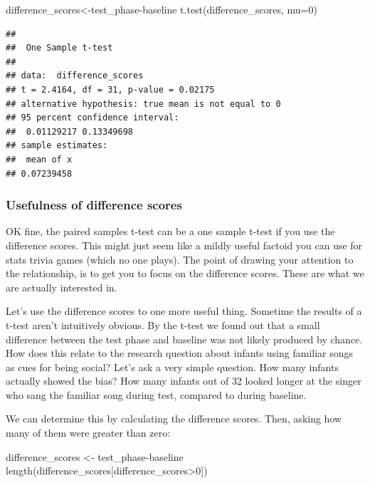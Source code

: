 \documentclass[
]{book}
\newenvironment{Shaded}{\begin{snugshade}}{\end{snugshade}}
\newcommand{\AttributeTok}[1]{\textcolor[rgb]{0.77,0.63,0.00}{#1}}
\newcommand{\DecValTok}[1]{\textcolor[rgb]{0.00,0.00,0.81}{#1}}
\newcommand{\FunctionTok}[1]{\textcolor[rgb]{0.00,0.00,0.00}{#1}}
\newcommand{\NormalTok}[1]{#1}
\newcommand{\OtherTok}[1]{\textcolor[rgb]{0.56,0.35,0.01}{#1}}
\newcommand{\SpecialCharTok}[1]{\textcolor[rgb]{0.00,0.00,0.00}{#1}}
\begin{document}
\begin{Shaded}
\begin{Highlighting}[]
\NormalTok{difference\_scores}\OtherTok{\textless{}{-}}\NormalTok{test\_phase}\SpecialCharTok{{-}}\NormalTok{baseline}
\FunctionTok{t.test}\NormalTok{(difference\_scores, }\AttributeTok{mu=}\DecValTok{0}\NormalTok{)}
\end{Highlighting}
\end{Shaded}

\begin{verbatim}
## 
##  One Sample t-test
## 
## data:  difference_scores
## t = 2.4164, df = 31, p-value = 0.02175
## alternative hypothesis: true mean is not equal to 0
## 95 percent confidence interval:
##  0.01129217 0.13349698
## sample estimates:
##  mean of x 
## 0.07239458
\end{verbatim}

\hypertarget{usefulness-of-difference-scores}{%
\subsubsection{Usefulness of difference scores}\label{usefulness-of-difference-scores}}

OK fine, the paired samples t-test can be a one sample t-test if you use the difference scores. This might just seem like a mildly useful factoid you can use for stats trivia games (which no one plays). The point of drawing your attention to the relationship, is to get you to focus on the difference scores. These are what we are actually interested in.

Let's use the difference scores to one more useful thing. Sometime the results of a t-test aren't intuitively obvious. By the t-test we found out that a small difference between the test phase and baseline was not likely produced by chance. How does this relate to the research question about infants using familiar songs as cues for being social? Let's ask a very simple question. How many infants actually showed the bias? How many infants out of 32 looked longer at the singer who sang the familiar song during test, compared to during baseline.

We can determine this by calculating the difference scores. Then, asking how many of them were greater than zero:

\begin{Shaded}
\begin{Highlighting}[]
\NormalTok{difference\_scores }\OtherTok{\textless{}{-}}\NormalTok{ test\_phase}\SpecialCharTok{{-}}\NormalTok{baseline}
\FunctionTok{length}\NormalTok{(difference\_scores[difference\_scores}\SpecialCharTok{\textgreater{}}\DecValTok{0}\NormalTok{])}
\end{Highlighting}
\end{Shaded}
\end{document}
